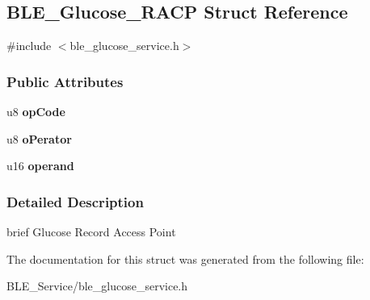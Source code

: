 \hypertarget{struct_b_l_e___glucose___r_a_c_p}{}\subsection{B\+L\+E\+\_\+\+Glucose\+\_\+\+R\+A\+CP Struct Reference}
\label{struct_b_l_e___glucose___r_a_c_p}


{\ttfamily \#include $<$ble\+\_\+glucose\+\_\+service.\+h$>$}

\subsubsection*{Public Attributes}
\begin{DoxyCompactItemize}
\item 
u8 {\bfseries op\+Code}\hypertarget{struct_b_l_e___glucose___r_a_c_p_a6d3a65f988f2b1fc520f1ffd7ff76101}{}\label{struct_b_l_e___glucose___r_a_c_p_a6d3a65f988f2b1fc520f1ffd7ff76101}

\item 
u8 {\bfseries o\+Perator}\hypertarget{struct_b_l_e___glucose___r_a_c_p_a09bf80ec7e7254cd0fe929cbc32f92cd}{}\label{struct_b_l_e___glucose___r_a_c_p_a09bf80ec7e7254cd0fe929cbc32f92cd}

\item 
u16 {\bfseries operand}\hypertarget{struct_b_l_e___glucose___r_a_c_p_af2242a6f72f5363adf1515ce850a0b80}{}\label{struct_b_l_e___glucose___r_a_c_p_af2242a6f72f5363adf1515ce850a0b80}

\end{DoxyCompactItemize}


\subsubsection{Detailed Description}
brief Glucose Record Access Point 

The documentation for this struct was generated from the following file\+:\begin{DoxyCompactItemize}
\item 
B\+L\+E\+\_\+\+Service/ble\+\_\+glucose\+\_\+service.\+h\end{DoxyCompactItemize}
